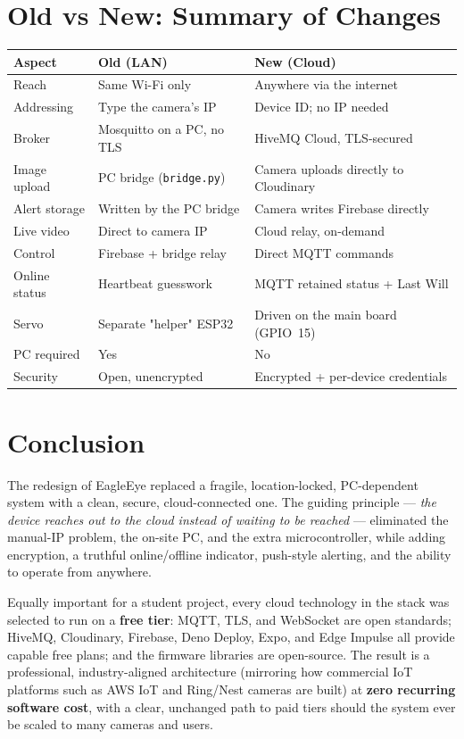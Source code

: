 \documentclass[11pt,a4paper]{article}
\newcommand{\code}[1]{\texttt{#1}}
\begin{document}
\section{Old vs New: Summary of Changes}\label{sec:compare}
\renewcommand{\arraystretch}{1.3}
\begin{tabularx}{\linewidth}{@{}lXX@{}}
\toprule
\textbf{Aspect} & \textbf{Old (LAN)} & \textbf{New (Cloud)} \\
\midrule
Reach           & Same Wi-Fi only            & Anywhere via the internet \\
Addressing      & Type the camera's IP       & Device ID; no IP needed \\
Broker          & Mosquitto on a PC, no TLS  & HiveMQ Cloud, TLS-secured \\
Image upload    & PC bridge (\code{bridge.py}) & Camera uploads directly to Cloudinary \\
Alert storage   & Written by the PC bridge   & Camera writes Firebase directly \\
Live video      & Direct to camera IP        & Cloud relay, on-demand \\
Control         & Firebase + bridge relay    & Direct MQTT commands \\
Online status   & Heartbeat guesswork        & MQTT retained status + Last Will \\
Servo           & Separate "helper" ESP32    & Driven on the main board (GPIO~15) \\
PC required     & Yes                        & No \\
Security        & Open, unencrypted          & Encrypted + per-device credentials \\
\bottomrule
\end{tabularx}

\section{Conclusion}\label{sec:conclusion}
The redesign of EagleEye replaced a fragile, location-locked, PC-dependent system with a
clean, secure, cloud-connected one. The guiding principle --- \emph{the device reaches out to
the cloud instead of waiting to be reached} --- eliminated the manual-IP problem, the on-site
PC, and the extra microcontroller, while adding encryption, a truthful online/offline
indicator, push-style alerting, and the ability to operate from anywhere.

Equally important for a student project, every cloud technology in the stack was selected to
run on a \textbf{free tier}: MQTT, TLS, and WebSocket are open standards; HiveMQ, Cloudinary,
Firebase, Deno Deploy, Expo, and Edge Impulse all provide capable free plans; and the firmware
libraries are open-source. The result is a professional, industry-aligned architecture
(mirroring how commercial IoT platforms such as AWS IoT and Ring/Nest cameras are built) at
\textbf{zero recurring software cost}, with a clear, unchanged path to paid tiers should the
system ever be scaled to many cameras and users.
\end{document}

